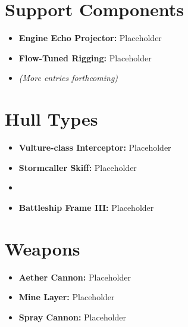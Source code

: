 \documentclass[11pt]{article}
\begin{document}
\section{Support Components} %
\begin{itemize}
    \item \textbf{Engine Echo Projector:} Placeholder
    \item \textbf{Flow-Tuned Rigging:} Placeholder
    \item \textit{(More entries forthcoming)}
\end{itemize}

\section{Hull Types} %
\begin{itemize}
    \item \textbf{Vulture-class Interceptor:} Placeholder
    \item \textbf{Stormcaller Skiff:} Placeholder
    \item \item \textbf{Battleship Frame III:} Placeholder
\end{itemize}

\section{Weapons} %
\begin{itemize}
    \item \textbf{Aether Cannon:} Placeholder
    \item \textbf{Mine Layer:} Placeholder
    \item \textbf{Spray Cannon:} Placeholder
\end{itemize}
\end{document}
